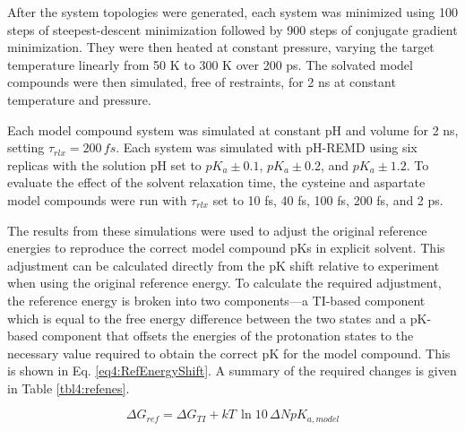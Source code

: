 After the system topologies were generated, each system was minimized using 100
steps of steepest-descent minimization followed by 900 steps of conjugate
gradient minimization.  They were then heated at constant pressure, varying the
target temperature linearly from 50 K to 300 K over 200 ps.  The solvated model
compounds were then simulated, free of restraints, for 2 ns at constant
temperature and pressure.

Each model compound system was simulated at constant pH and volume for 2 ns,
setting $\tau_{rlx} = 200\,fs$. Each system was simulated with pH-REMD using six
replicas with the solution pH set to $pK_a \pm 0.1$, $pK_a \pm 0.2$, and $pK_a
\pm 1.2$. To evaluate the effect of the solvent relaxation time, the cysteine
and aspartate model compounds were run with $\tau_{rlx}$ set to 10 fs, 40 fs,
100 fs, 200 fs, and 2 ps.

The results from these simulations were used to adjust the original reference
energies to reproduce the correct model compound pKs in explicit solvent.
This adjustment can be calculated directly from the pK shift relative to
experiment when using the original reference energy. To calculate the required
adjustment, the reference energy is broken into two components---a TI-based
component which is equal to the free energy difference between the two states
and a pK-based component that offsets the energies of the protonation
states to the necessary value required to obtain the correct pK for the
model compound. This is shown in Eq. \ref{eq4:RefEnergyShift}. A summary of the
required changes is given in Table \ref{tbl4:refenes}.

\begin{equation}
   \Delta G _ {ref} = \Delta G_{TI} + kT\,\ln 10\, \Delta N pK_{a, model}
   \label{eq4:RefEnergyShift}
\end{equation}

